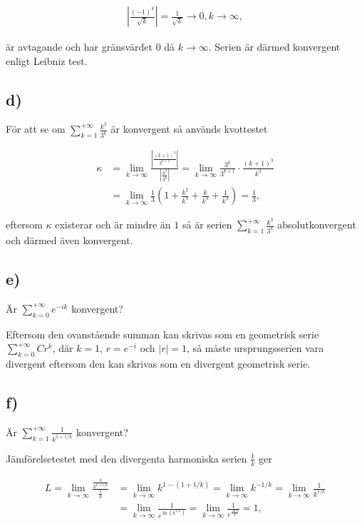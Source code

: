 \documentclass[a4paper]{article}
\begin{document}
\begin{align*}
  \left| \frac{(-1)^k}{\sqrt{k}} \right| = \frac{1}{\sqrt{k}} \to 0, k \to \infty,
\end{align*}

är avtagande och har gränsvärdet $0$ då $k\to\infty$. Serien är därmed
konvergent enligt Leibniz test.

\subsection*{d)}

För att se om $\sum_{k=1}^{+\infty}\frac{k^3}{3^k}$ är konvergent så används
kvottestet

\begin{align*}
 \kappa &= \lim_{k\to\infty} \frac{\left| \frac{(k+1)^3}{3^{k+1}} \right|}{\left| \frac{k^3}{3^k} \right|}
          = \lim_{k\to\infty} \frac{3^k}{3^{k+1}}\cdot\frac{(k+1)^3}{k^3}\\
  &= \lim_{k\to\infty} \frac{1}{3}\left( 1 + \frac{k^2}{k^3} + \frac{k}{k^3} + \frac{1}{k^3} \right) = \frac{1}{3},
\end{align*}

eftersom $\kappa$ existerar och är mindre än $1$ så är serien
$\sum_{k=1}^{+\infty}\frac{k^3}{3^k}$ absolutkonvergent och därmed även konvergent.

\subsection*{e)}

Är $\sum_{k=0}^{+\infty}e^{-ik}$ konvergent?

Eftersom den ovanstående summan kan skrivas som en geometrisk serie
$\sum_{k=0}^{+\infty}Cr^k$, där $k = 1$, $r = e^{-i}$ och $|r| = 1$, så måste
ursprungsserien vara divergent eftersom den kan skrivas som en divergent
geometrisk serie.

\subsection*{f)}

Är $\sum_{k=1}^{+\infty}\frac{1}{k^{1+1/k}}$ konvergent?

Jämförelsetestet med den divergenta harmoniska serien $\frac{1}{k}$ ger

\begin{align*}
  L = \lim_{k\to\infty} \frac{\frac{1}{k^{1+1/k}}}{\frac{1}{k}} &= \lim_{k\to\infty}k^{1-(1+1/k)} = \lim_{k\to\infty}k^{-1/k} = \lim_{k\to\infty}\frac{1}{k^{1/k}}\\ &= \lim_{k\to\infty} \frac{1}{e^{\ln(k^{1/k})}} = \lim_{k\to\infty} \frac{1}{e^{\frac{\ln k}{k}}} = 1,
\end{align*}
\end{document}
